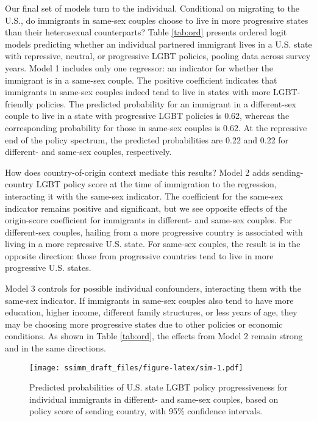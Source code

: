 \documentclass[
  11pt,
]{article}
\begin{document}
Our final set of models turn to the individual. Conditional on migrating to the U.S., do immigrants in same-sex couples choose to live in more progressive states than their heterosexual counterparts? Table \ref{tab:ord} presents ordered logit models predicting whether an individual partnered immigrant lives in a U.S. state with repressive, neutral, or progressive LGBT policies, pooling data across survey years. Model 1 includes only one regressor: an indicator for whether the immigrant is in a same-sex couple. The positive coefficient indicates that immigrants in same-sex couples indeed tend to live in states with more LGBT-friendly policies. The predicted probability for an immigrant in a different-sex couple to live in a state with progressive LGBT policies is 0.62, whereas the corresponding probability for those in same-sex couples is 0.62. At the repressive end of the policy spectrum, the predicted probabilities are 0.22 and 0.22 for different- and same-sex couples, respectively.

How does country-of-origin context mediate this results? Model 2 adds sending-country LGBT policy score at the time of immigration to the regression, interacting it with the same-sex indicator. The coefficient for the same-sex indicator remains positive and significant, but we see opposite effects of the origin-score coefficient for immigrants in different- and same-sex couples. For different-sex couples, hailing from a more progressive country is associated with living in a more repressive U.S. state. For same-sex couples, the result is in the opposite direction: those from progressive countries tend to live in more progressive U.S. states.

Model 3 controls for possible individual confounders, interacting them with the same-sex indicator. If immigrants in same-sex couples also tend to have more education, higher income, different family structures, or less years of age, they may be choosing more progressive states due to other policies or economic conditions. As shown in Table \ref{tab:ord}, the effects from Model 2 remain strong and in the same directions.

\begin{figure}
\centering
\texttt{[image: ssimm\_draft\_files/figure-latex/sim-1.pdf]}
\caption{\label{fig:sim}Predicted probabilities of U.S. state LGBT policy progressiveness for individual immigrants in different- and same-sex couples, based on policy score of sending country, with 95\% confidence intervals.}
\end{figure}
\end{document}
